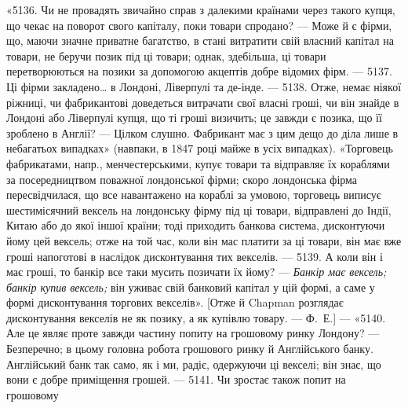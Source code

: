 «5136. Чи не провадять звичайно справ з далекими країнами через такого
купця, що чекає на поворот свого капіталу, поки товари спродано? — Може й
є фірми, що, маючи значне приватне багатство, в стані витратити свій власний
капітал на товари, не беручи позик під ці товари; однак, здебільша, ці товари
перетворюються на позики за допомогою акцептів добре відомих фірм. — 5137.
Ці фірми закладено\dots{} в Лондоні, Ліверпулі та де-інде. — 5138. Отже, немає ніякої
ріжниці, чи фабрикантові доведеться витрачати свої власні гроші, чи він знайде
в Лондоні або Ліверпулі купця, що ті гроші визичить; це завжди є позика, що
її зроблено в Англії? — Цілком слушно. Фабрикант має з цим дещо до діла лише
в небагатьох випадках» (навпаки, в 1847 році майже в усіх випадках). «Торговець
фабрикатами, напр., менчестерськими, купує товари та відправляє їх
кораблями за посередництвом поважної лондонської фірми; скоро лондонська фірма
пересвідчилася, що все навантажено на кораблі за умовою, торговець виписує
шестимісячний вексель на лондонську фірму під ці товари, відправлені до Індії,
Китаю або до якої іншої країни; тоді приходить банкова система, дисконтуючи
йому цей вексель; отже на той час, коли він мас платити за ці товари, він
має вже гроші напоготові в наслідок дисконтування тих векселів. — 5139. А коли
він і має гроші, то банкір все таки мусить позичати їх йому? — \emph{Банкір має
вексель; банкір купив вексель;} він уживає свій банковий капітал у цій формі,
а саме у формі дисконтування торгових векселів». [Отже й Chapman розглядає
дисконтування векселів не як позику, а як купівлю товару. — Ф.~Е.] — «5140.
Але це являє проте завжди частину попиту на грошовому ринку Лондону? —
Безперечно; в цьому головна робота грошового ринку й Англійського банку.
Англійський банк так само, як і ми, радіє, одержуючи ці векселі; він знає, що
вони є добре приміщення грошей. — 5141. Чи зростає також попит на грошовому
\parbreak{}  %
